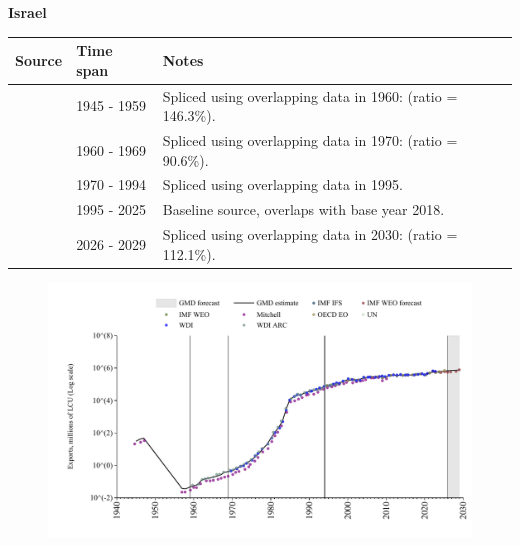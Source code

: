 \documentclass[12pt,a4paper,landscape]{article}
\begin{document}
\begin{adjustbox}{max totalsize={\paperwidth}{\paperheight},center}
\begin{minipage}[t][\textheight][t]{\textwidth}
\vspace*{0.5cm}
{}
\begin{center}
{\Large\bfseries Israel}
\end{center}
\vspace{0.5cm}
\begin{table}[H]
\centering
\small
\begin{tabular}{|l|l|l|}
\hline
\textbf{Source} & \textbf{Time span} & \textbf{Notes} \\
\hline
\rowcolor{white}\cite{Mitchell}& 1945 - 1959 &Spliced using overlapping data in 1960: (ratio = 146.3\%).\\
\rowcolor{lightgray}\cite{WDI_ARC}& 1960 - 1969 &Spliced using overlapping data in 1970: (ratio = 90.6\%).\\
\rowcolor{white}\cite{WDI}& 1970 - 1994 &Spliced using overlapping data in 1995.\\
\rowcolor{lightgray}\cite{OECD_EO}& 1995 - 2025 &Baseline source, overlaps with base year 2018.\\
\rowcolor{white}\cite{IMF_WEO_forecast}& 2026 - 2029 &Spliced using overlapping data in 2030: (ratio = 112.1\%).\\
\hline
\end{tabular}
\end{table}
\begin{figure}[H]
\centering
\includegraphics[width=\textwidth,height=0.6\textheight,keepaspectratio]{graphs/ISR_exports.pdf}
\end{figure}
\end{minipage}
\end{adjustbox}
\end{document}
